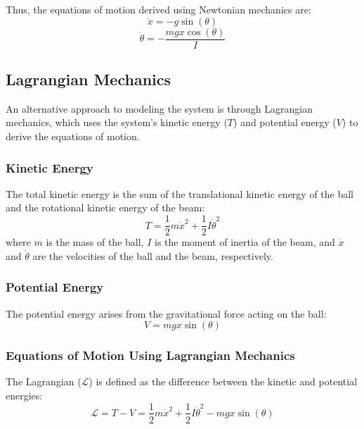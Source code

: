 \documentclass[conference]{IEEEtran}
\begin{document}
Thus, the equations of motion derived using Newtonian mechanics are:
\begin{equation}
\ddot{x} = -g \sin(\theta)
\end{equation}
\begin{equation}
\ddot{\theta} = -\frac{m g x \cos(\theta)}{I}
\end{equation}

\subsection{Lagrangian Mechanics}
\label{subsec:model_lagrangian}
An alternative approach to modeling the system is through Lagrangian mechanics, which uses the system's kinetic energy (\(T\)) and potential energy (\(V\)) to derive the equations of motion.

\subsubsection{Kinetic Energy}
\label{subsubsec:model_lag_kinetic}
The total kinetic energy is the sum of the translational kinetic energy of the ball and the rotational kinetic energy of the beam:
\begin{equation}
T = \frac{1}{2} m \dot{x}^2 + \frac{1}{2} I \dot{\theta}^2
\end{equation}
where \(m\) is the mass of the ball, \(I\) is the moment of inertia of the beam, and \(\dot{x}\) and \(\dot{\theta}\) are the velocities of the ball and the beam, respectively.

\subsubsection{Potential Energy}
\label{subsubsec:model_lag_potential}
The potential energy arises from the gravitational force acting on the ball:
\begin{equation}
V = m g x \sin(\theta)
\end{equation}

\subsubsection{Equations of Motion Using Lagrangian Mechanics}
\label{subsubsec:model_lag_eq}
The Lagrangian (\(\mathcal{L}\)) is defined as the difference between the kinetic and potential energies:
\begin{equation}
\mathcal{L} = T - V = \frac{1}{2} m \dot{x}^2 + \frac{1}{2} I \dot{\theta}^2 - m g x \sin(\theta)
\end{equation}
\end{document}
